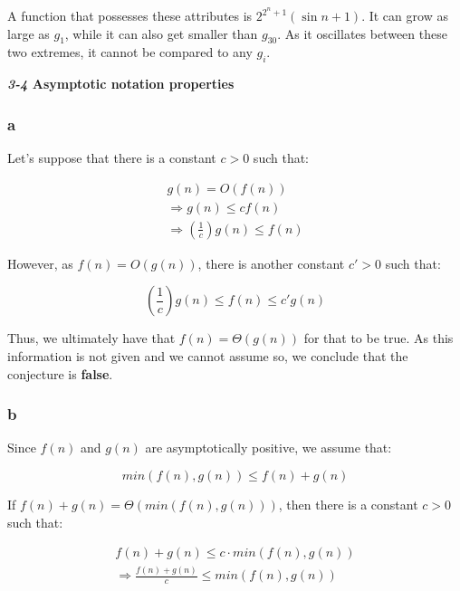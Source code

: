 \documentclass[8pt,a4paper]{article}
\begin{document}
  A function that possesses these attributes is $2^{2^{n} + 1} (\sin n + 1)$. It can grow
as large as $g_{1}$, while it can also get smaller than $g_{30}$. As it oscillates between these two
extremes, it cannot be compared to any $g_{i}$.

\begin{framed}
  \textbf{\textit{3-4} Asymptotic notation properties}
\end{framed}

\subsubsection*{a}

  Let's suppose that there is a constant $c > 0$ such that:

\begin{equation*}
  \begin{split}
    g(n) = O(f(n)) \\
    \Rightarrow g(n) \leq c f(n) \\
    \Rightarrow \left(\frac{1}{c}\right) g(n) \leq f(n)
  \end{split}
\end{equation*}

  However, as $f(n) = O(g(n))$, there is another constant $c' > 0$ such that:

\begin{equation*}
  \left(\frac{1}{c}\right) g(n) \leq f(n) \leq c' g(n)
\end{equation*}

  Thus, we ultimately have that $f(n) = \Theta(g(n))$ for that to be true. As this information
is not given and we cannot assume so, we conclude that the conjecture is \textbf{false}.

\subsubsection*{b}

  Since $f(n)$ and $g(n)$ are asymptotically positive, we assume that:

\begin{equation*}
  min(f(n), g(n)) \leq f(n) + g(n)
\end{equation*}

  If $f(n) + g(n) = \Theta(min(f(n), g(n)))$, then there is a constant $c > 0$ such that:

\begin{equation*}
  \begin{split}
    f(n) + g(n) \leq c \cdot min(f(n), g(n)) \\
    \Rightarrow \frac{f(n) + g(n)}{c} \leq min(f(n), g(n))
  \end{split}
\end{equation*}
\end{document}
